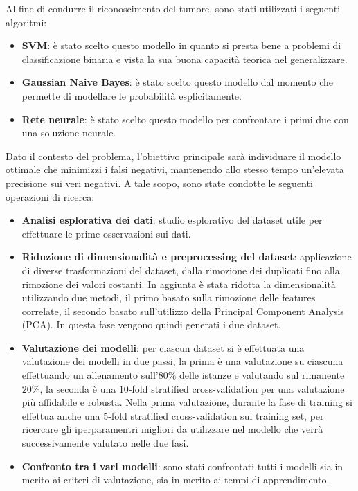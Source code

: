 Al fine di condurre il riconoscimento del tumore, sono stati utilizzati i
seguenti algoritmi:
\begin{itemize}
      \item \textbf{SVM}: è stato scelto questo modello in quanto si presta bene
            a problemi di classificazione binaria e vista la sua buona capacità
            teorica nel generalizzare.
      \item \textbf{Gaussian Naive Bayes}: è stato scelto questo modello dal
            momento che permette di modellare le probabilità esplicitamente.
      \item \textbf{Rete neurale}: è stato scelto questo modello per confrontare
            i primi due con una soluzione neurale.
\end{itemize}
Dato il contesto del problema, l'obiettivo principale sarà individuare il modello
ottimale che minimizzi i falsi negativi, mantenendo allo stesso tempo un'elevata
precisione sui veri negativi. A tale scopo, sono state condotte le seguenti
operazioni di ricerca:
\begin{itemize}
      \item \textbf{Analisi esplorativa dei dati}: studio esplorativo del dataset
            utile per effettuare le prime osservazioni sui dati.
      \item \textbf{Riduzione di dimensionalità e preprocessing del dataset}:
            applicazione di diverse trasformazioni del dataset, dalla rimozione
            dei duplicati fino alla rimozione dei valori costanti. In aggiunta è
            stata ridotta la dimensionalità utilizzando due metodi, il primo
            basato sulla rimozione delle features correlate, il secondo basato
            sull'utilizzo della Principal Component Analysis (PCA). In questa fase
            vengono quindi generati i due dataset.
      \item \textbf{Valutazione dei modelli}: per ciascun dataset si è effettuata
            una valutazione dei modelli in due passi, la prima è una valutazione
            su ciascuna effettuando un allenamento sull'$80\%$ delle istanze e
            valutando sul rimanente $20\%$, la seconda è una $10$-fold stratified
            cross-validation per una valutazione più affidabile e robusta.
            Nella prima valutazione, durante la fase di training si effettua anche
            una $5$-fold stratified cross-validation sul training set, per
            ricercare gli iperparamentri migliori da utilizzare nel modello che
            verrà successivamente valutato nelle due fasi.
      \item \textbf{Confronto tra i vari modelli}: sono stati confrontati tutti
            i modelli sia in merito ai criteri di valutazione, sia in merito ai
            tempi di apprendimento.
\end{itemize}
